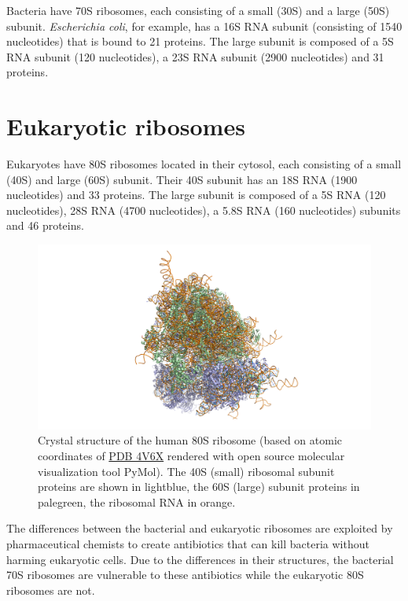 Bacteria have 70S ribosomes, each consisting of a small (30S) and a large (50S) subunit. \emph{Escherichia coli}, for example, has a 16S RNA subunit (consisting of 1540 nucleotides) that is bound to 21 proteins. The large subunit is composed of a 5S RNA subunit (120 nucleotides), a 23S RNA subunit (2900 nucleotides) and 31 proteins.

\hypertarget{eukaryotic-ribosomes}{%
\section{Eukaryotic ribosomes}\label{eukaryotic-ribosomes}}

Eukaryotes have 80S ribosomes located in their cytosol, each consisting of a small (40S) and large (60S) subunit. Their 40S subunit has an 18S RNA (1900 nucleotides) and 33 proteins. The large subunit is composed of a 5S RNA (120 nucleotides), 28S RNA (4700 nucleotides), a 5.8S RNA (160 nucleotides) subunits and 46 proteins.



\begin{figure}

{\centering \includegraphics[width=0.7\linewidth]{./figures/translation/human_ribosome} 

}

\caption{Crystal structure of the human 80S ribosome (based on atomic coordinates of \href{https://www.rcsb.org/structure/4v6x}{PDB 4V6X} rendered with open source molecular visualization tool PyMol). The 40S (small) ribosomal subunit proteins are shown in lightblue, the 60S (large) subunit proteins in palegreen, the ribosomal RNA in orange.}\label{fig:ribosome}
\end{figure}

The differences between the bacterial and eukaryotic ribosomes are exploited by pharmaceutical chemists to create antibiotics that can kill bacteria without harming eukaryotic cells. Due to the differences in their structures, the bacterial 70S ribosomes are vulnerable to these antibiotics while the eukaryotic 80S ribosomes are not.

